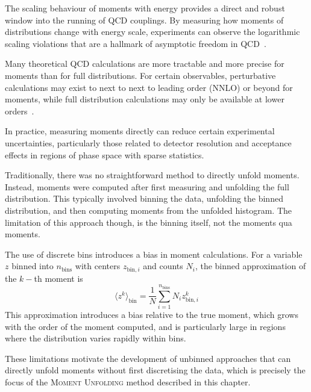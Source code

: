         The scaling behaviour of moments with energy provides a direct and robust window into the running of QCD couplings.
        By measuring how moments of distributions change with energy scale, experiments can observe the logarithmic scaling violations that are a hallmark of asymptotic freedom in QCD~\cite{Gross:1973id, Deur2016TheCoupling, Abe1990DeterminationApproximation, Farhi1977QuantumJets}.

        Many theoretical QCD calculations are more tractable and more precise for moments than for full distributions.
        For certain observables, perturbative calculations may exist to next to next to leading order (NNLO) or beyond for moments, while full distribution calculations may only be available at lower orders~\cite{Catani:1992ua, gehrmannResummationJetRates2017, Ridder2009NNLOAnnihilation, Chandramohan1981ConsequencesAnnihilation, Catani1991ThrustAnnihilation, Catani1991HeavyAnnihilation}.
        
        In practice, measuring moments directly can reduce certain experimental uncertainties, particularly those related to detector resolution and acceptance effects in regions of phase space with sparse statistics.

        Traditionally, there was no straightforward method to directly unfold moments.
        Instead, moments were computed after first measuring and unfolding the full distribution.
        This typically involved binning the data, unfolding the binned distribution, and then computing moments from the unfolded histogram.
        The limitation of this approach though, is the binning itself, not the moments qua moments.
        
        The use of discrete bins introduces a bias in moment calculations.
        For a variable $z$ binned into $n_{\text{bins}}$ with centers $z_{\text{bin},i}$ and counts $N_i$, the binned approximation of the $k-$th moment is
        \[
            \langle z^k \rangle_{\text{bin}} = \frac{1}{N} \sum_{i=1}^{n_{\text{bins}}} N_i z_{\text{bin},i}^k
        \]
        This approximation introduces a bias relative to the true moment, which grows with the order of the moment computed, and is particularly large in regions where the distribution varies rapidly within bins.

        These limitations motivate the development of unbinned approaches that can directly unfold moments without first discretising the data, which is precisely the focus of the \textsc{Moment Unfolding} method described in this chapter.
